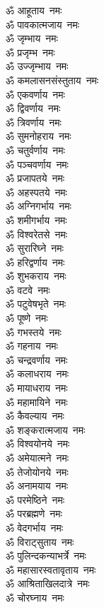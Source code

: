 \begin{multicols}{2}
\begin{flushleft}
ॐ आहूताय~नमः\hfill{}\\
ॐ पावकात्मजाय~नमः\\
ॐ जृम्भाय~नमः\\
ॐ प्रजृम्भ~नमः\\
ॐ उज्जृम्भाय~नमः\\
ॐ कमलासनसंस्तुताय~नमः\\
ॐ एकवर्णाय~नमः\\
ॐ द्विवर्णाय~नमः\\
ॐ त्रिवर्णाय~नमः\\
ॐ सुमनोहराय~नमः\\
ॐ चतुर्वर्णाय~नमः\hfill{}\\
ॐ पञ्चवर्णाय~नमः\\
ॐ प्रजापतये~नमः\\
ॐ अहस्पतये~नमः\\
ॐ अग्निगर्भाय~नमः\\
ॐ शमीगर्भाय~नमः\\
ॐ विश्वरेतसे~नमः\\
ॐ सुरारिघ्ने~नमः\\
ॐ हरिद्वर्णाय~नमः\\
ॐ शुभकराय~नमः\\
ॐ वटवे~नमः\hfill{}\\
ॐ पटुवेषभृते~नमः\\
ॐ पूष्णे~नमः\\
ॐ गभस्तये~नमः\\
ॐ गहनाय~नमः\\
ॐ चन्द्रवर्णाय~नमः\\
ॐ कलाधराय~नमः\\
ॐ मायाधराय~नमः\\
ॐ महामायिने~नमः\\
ॐ कैवल्याय~नमः\\
ॐ शङ्करात्मजाय~नमः\hfill{}\\
ॐ विश्वयोनये~नमः\\
ॐ अमेयात्मने~नमः\\
ॐ तेजोयोनये~नमः\\
ॐ अनामयाय~नमः\\
ॐ परमेष्ठिने~नमः\\
ॐ परब्रह्मणे~नमः\\
ॐ वेदगर्भाय~नमः\\
ॐ विराट्सुताय~नमः\\
ॐ पुलिन्दकन्याभर्त्रे~नमः\\
ॐ महासारस्वतावृताय~नमः\hfill{}\\
ॐ आश्रिताखिलदात्रे~नमः\\
ॐ चोरघ्नाय~नमः\\

\end{flushleft}
\end{multicols}
